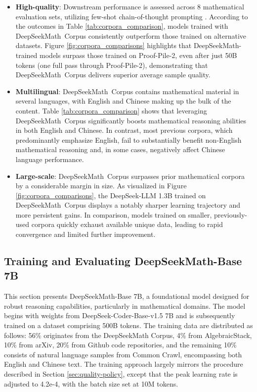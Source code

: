 \begin{itemize}[topsep=0pt]
    \item \textbf{High-quality}:
    Downstream performance is assessed across 8 mathematical evaluation sets, utilizing few-shot chain-of-thought prompting \cite{cot}. According to the outcomes in Table \ref{tab:corpora_comparison}, models trained with DeepSeekMath~Corpus consistently outperform those trained on alternative datasets. Figure \ref{fig:corpora_comparisons} highlights that DeepSeekMath-trained models surpass those trained on Proof-Pile-2, even after just 50B tokens (one full pass through Proof-Pile-2), demonstrating that DeepSeekMath~Corpus delivers superior average sample quality.
    \item \textbf{Multilingual}:
    DeepSeekMath~Corpus contains mathematical material in several languages, with English and Chinese making up the bulk of the content. Table \ref{tab:corpora_comparison} shows that leveraging DeepSeekMath~Corpus significantly boosts mathematical reasoning abilities in both English and Chinese. In contrast, most previous corpora, which predominantly emphasize English, fail to substantially benefit non-English mathematical reasoning and, in some cases, negatively affect Chinese language performance.
    \item \textbf{Large-scale}:
    DeepSeekMath~Corpus surpasses prior mathematical corpora by a considerable margin in size. As visualized in Figure \ref{fig:corpora_comparisons}, the DeepSeek-LLM 1.3B trained on DeepSeekMath~Corpus displays a notably sharper learning trajectory and more persistent gains. In comparison, models trained on smaller, previously-used corpora quickly exhaust available unique data, leading to rapid convergence and limited further improvement.
\end{itemize}

\subsection{Training and Evaluating DeepSeekMath-Base 7B}

This section presents DeepSeekMath-Base 7B, a foundational model designed for robust reasoning capabilities, particularly in mathematical domains. The model begins with weights from DeepSeek-Coder-Base-v1.5 7B \citep{deepseek-coder} and is subsequently trained on a dataset comprising 500B tokens. The training data are distributed as follows: 56\% originates from the DeepSeekMath Corpus, 4\% from AlgebraicStack, 10\% from arXiv, 20\% from Github code repositories, and the remaining 10\% consists of natural language samples from Common Crawl, encompassing both English and Chinese text. The training approach largely mirrors the procedure described in Section \ref{sec:quality-policy}, except that the peak learning rate is adjusted to 4.2e-4, with the batch size set at 10M tokens.

